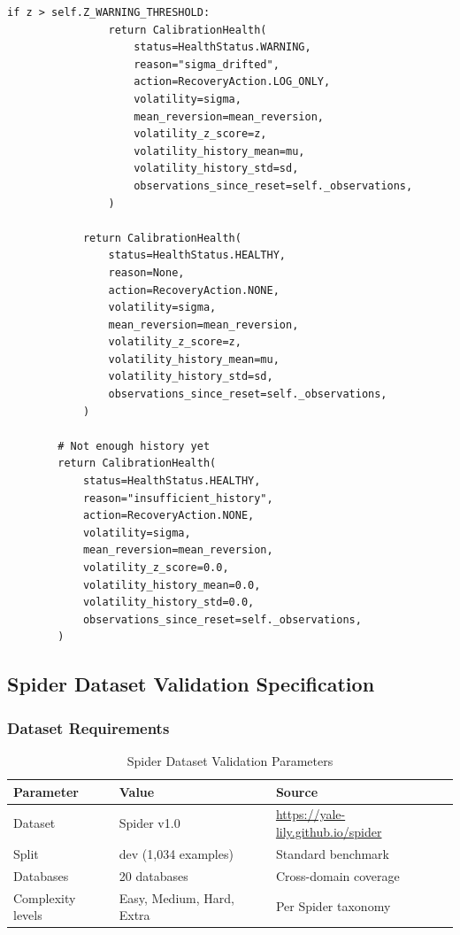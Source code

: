 \begin{lstlisting}[language=jsonx,caption={Calibration health check implementation}]
            if z > self.Z_WARNING_THRESHOLD:
                return CalibrationHealth(
                    status=HealthStatus.WARNING,
                    reason="sigma_drifted",
                    action=RecoveryAction.LOG_ONLY,
                    volatility=sigma,
                    mean_reversion=mean_reversion,
                    volatility_z_score=z,
                    volatility_history_mean=mu,
                    volatility_history_std=sd,
                    observations_since_reset=self._observations,
                )
            
            return CalibrationHealth(
                status=HealthStatus.HEALTHY,
                reason=None,
                action=RecoveryAction.NONE,
                volatility=sigma,
                mean_reversion=mean_reversion,
                volatility_z_score=z,
                volatility_history_mean=mu,
                volatility_history_std=sd,
                observations_since_reset=self._observations,
            )
        
        # Not enough history yet
        return CalibrationHealth(
            status=HealthStatus.HEALTHY,
            reason="insufficient_history",
            action=RecoveryAction.NONE,
            volatility=sigma,
            mean_reversion=mean_reversion,
            volatility_z_score=0.0,
            volatility_history_mean=0.0,
            volatility_history_std=0.0,
            observations_since_reset=self._observations,
        )
\end{lstlisting}

\subsection{Spider Dataset Validation Specification}
\label{sec:spider-validation-impl}

\subsubsection{Dataset Requirements}

\begin{table}[htbp]
\centering
\caption{Spider Dataset Validation Parameters}
\begin{tabular}{l l l}
\toprule
\textbf{Parameter} & \textbf{Value} & \textbf{Source} \\
\midrule
Dataset & Spider v1.0 & \url{https://yale-lily.github.io/spider} \\
Split & dev (1,034 examples) & Standard benchmark \\
Databases & 20 databases & Cross-domain coverage \\
Complexity levels & Easy, Medium, Hard, Extra & Per Spider taxonomy \\
\bottomrule
\end{tabular}
\end{table}

